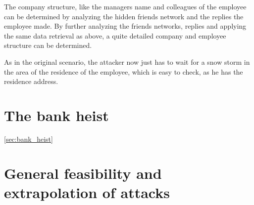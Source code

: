 The company structure, like the managers name and colleagues of the employee
can be determined by analyzing the hidden friends network and the replies the
employee made. By further analyzing the friends networks, replies and applying
the same data retrieval as above, a quite detailed company and employee
structure can be determined.

As in the original scenario, the attacker now just has to wait for a snow storm
in the area of the residence of the employee, which is easy to check, as he
has the residence address.

\section{The bank heist}
\ref{sec:bank_heist}



\section{General feasibility and extrapolation of attacks}
